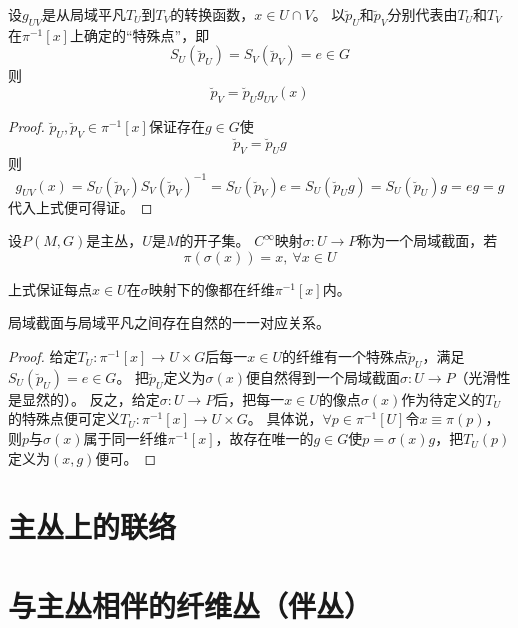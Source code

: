 \begin{theorem}
    设$g_{UV}$是从局域平凡$T_U$到$T_V$的转换函数，$x \in U \cap V$。
    以$\breve p_U$和$\breve p_V$分别代表由$T_U$和$T_V$在$\pi^{-1}[x]$上确定的``特殊点''，即
    $$S_U(\breve p_U) = S_V(\breve p_V) = e \in G$$
    则
    $$\breve p_V = \breve p_Ug_{UV}(x)$$
\end{theorem}

\begin{proof}
    $\breve p_U, \breve p_V \in \pi^{-1}[x]$保证存在$g \in G$使
    $$\breve p_V = \breve p_Ug$$
    则
    $$g_{UV}(x) = S_U(\breve p_V){S_V(\breve p_V)}^{-1} = S_U(\breve p_V)e = S_U(\breve p_Ug) = S_U(\breve p_U)g = eg = g$$
    代入上式便可得证。
\end{proof}

\begin{definition}
    设$P(M, G)$是主丛，$U$是$M$的开子集。
    $C^\infty$映射$\sigma \colon U \to P$称为一个局域截面，若
    $$\pi(\sigma(x)) = x, ~ \forall x \in U$$
\end{definition}

\begin{note}
    上式保证每点$x \in U$在$\sigma$映射下的像都在纤维$\pi^{-1}[x]$内。
\end{note}

\begin{theorem}
    局域截面与局域平凡之间存在自然的一一对应关系。
\end{theorem}

\begin{proof}
    给定$T_U \colon \pi^{-1}[x] \to U \times G$后每一$x \in U$的纤维有一个特殊点$\breve p_U$，满足$S_U(\breve p_U) = e \in G$。
    把$\breve p_U$定义为$\sigma(x)$便自然得到一个局域截面$\sigma \colon U \to P$（光滑性是显然的）。
    反之，给定$\sigma \colon U \to P$后，把每一$x \in U$的像点$\sigma(x)$作为待定义的$T_U$的特殊点便可定义$T_U \colon \pi^{-1}[x] \to U \times G$。
    具体说，$\forall p \in \pi^{-1}[U]$令$x \equiv \pi(p)$，则$p$与$\sigma(x)$属于同一纤维$\pi^{-1}[x]$，故存在唯一的$g \in G$使$p = \sigma(x)g$，把$T_U(p)$定义为$(x, g)$便可。
\end{proof}

\section{主丛上的联络}

\section{与主丛相伴的纤维丛（伴丛）}

